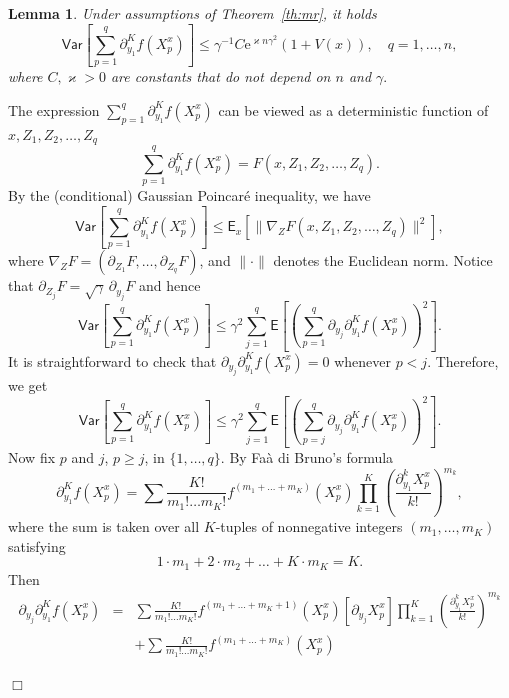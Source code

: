 \documentclass[bj]{imsart}
\def\rme{\mathrm{e}}
\newcommand{\proofendsign}{$\Box$}
\newtheorem{lem}[thm]{Lemma}
\newenvironment{proof}{{\noindent \bf Proof }}
 {{\hspace*{\fill}\proofendsign\par\bigskip}}
\begin{document}
\begin{lem}
\label{lem:var_poincare}
Under assumptions of Theorem~\ref{th:mr}, it holds
$$
\mathsf{Var}\left[\sum_{p=1}^{q}\partial_{y_{1}}^{K}f\left(X_{p}^x\right)\right]\le  \gamma^{-1} C \rme^{\varkappa n\gamma^2}(1+V(x)), \quad q=1,\ldots,n,
$$
where $C,\varkappa>0$ are constants that do not depend on $n$ and $\gamma.$
\end{lem}
\begin{proof}
The expression
$\sum_{p=1}^q \partial_{y_1}^K f(X_p^x)$
can be viewed as a deterministic function of
$x,Z_1,Z_{2},\ldots,Z_q$
$$
\sum_{p=1}^q  \partial_{y_1}^K f(X_p^x)
=F(x,Z_1,Z_{2},\ldots,Z_q).
$$
By the (conditional) Gaussian Poincar\'e inequality,
we have
$$
\mathsf{Var}\left[\sum_{p=1}^{q}\partial_{y_{1}}^{K}f\left(X_{p}^x\right)\right]
\le\mathsf E_x\left[
\|\nabla_Z F(x,Z_1,Z_{2},\ldots,Z_q)\|^2
\right],
$$
where $\nabla_Z F=(\partial_{Z_1} F,\ldots,\partial_{Z_q} F)$,
and $\|\cdot\|$ denotes the Euclidean norm.
Notice that \(\partial_{Z_j} F=\sqrt{\gamma}\,\partial_{y_j} F\) and
hence
$$
\mathsf{Var}\left[\sum_{p=1}^{q}\partial_{y_{1}}^{K}f\left(X_{p}^x\right)\right]\leq\gamma^2\sum_{j=1}^{q}\mathsf{E}\left[\left(\sum_{p=1}^{q}\partial_{y_{j}}\partial_{y_{1}}^{K}f\left(X_{p}^x\right)\right)^{2}\right].
$$
It is straightforward to check that
$\partial_{y_j}\partial_{y_1}^K f(X_p^x)=0$
whenever $p<j$. Therefore, we get
\begin{equation}\label{eq:10062018a2}
\mathsf{Var}\left[\sum_{p=1}^{q}\partial_{y_{1}}^{K}f\left(X_{p}^x\right)\right]\leq\gamma^2\sum_{j=1}^{q}\mathsf{E}\left[\left(\sum_{p=j}^{q}\partial_{y_{j}}\partial_{y_{1}}^{K}f\left(X_{p}^x\right)\right)^{2}\right].
\end{equation}
Now fix $p$ and $j$, $p\ge j$, in $\{1,\ldots,q\}$.
By Fa\`a di Bruno's formula
\[
\partial_{y_{1}}^{K}f\left(X_{p}^x\right)=\sum\frac{K!}{m_{1}!\ldots m_{K}!}f^{(m_{1}+\ldots+m_{K})}(X_{p}^x)\prod_{k=1}^{K}\left(\frac{\partial_{y_{1}}^{k}X^x_{p}}{k!}\right)^{m_{k}},
\]
where the sum is taken over all $K$-tuples of nonnegative integers
$(m_1,\ldots,m_K)$ satisfying
$$
1\cdot m_{1}+2\cdot m_{2}+\ldots+K\cdot m_{K}=K.
$$
Then
\begin{eqnarray*}
\partial_{y_{j}}\partial_{y_{1}}^{K}f\left(X_{p}^x\right)
&=&\sum\frac{K!}{m_{1}!\ldots m_{K}!}f^{(m_{1}+\ldots+m_{K}+1)}(X^x_{p})\left[\partial_{y_{j}}X^x_{p}\right]\prod_{k=1}^{K}\left(\frac{\partial_{y_{1}}^{k}X_{p}^x}{k!}\right)^{m_{k}} \\
&&+\sum\frac{K!}{m_{1}!\ldots m_{K}!}f^{(m_{1}+\ldots+m_{K})}(X^x_{p})

\end{eqnarray*}
\end{proof}
\end{document}
